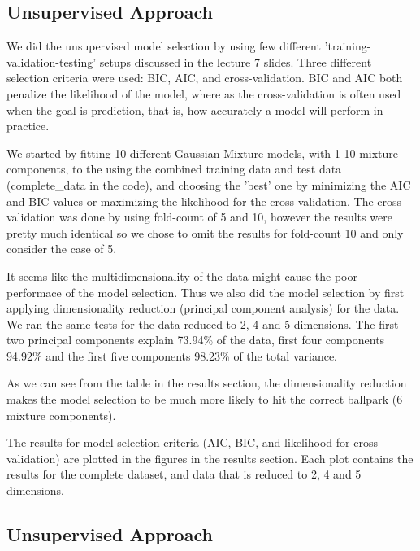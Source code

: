 \subsection{Unsupervised Approach}
We did the unsupervised model selection by using few different 'training-validation-testing' setups discussed in the lecture 7 slides. Three different selection criteria were used: BIC, AIC, and cross-validation. BIC and AIC both penalize the likelihood of the model, where as the cross-validation is often used when the goal is prediction, that is, how accurately a model will perform in practice.

We started by fitting 10 different Gaussian Mixture models, with 1-10 mixture components, to the using the combined training data and test data (complete\_data in the code), and choosing the 'best' one by minimizing the AIC and BIC values or maximizing the likelihood for the cross-validation. The cross-validation was done by using fold-count of 5 and 10, however the results were pretty much identical so we chose to omit the results for fold-count 10 and only consider the case of 5.

It seems like the multidimensionality of the data might cause the poor performace of the model selection. Thus we also did the model selection by first applying dimensionality reduction (principal component analysis) for the data. We ran the same tests for the data reduced to 2, 4 and 5 dimensions. The first two principal components explain 73.94\% of the data, first four components 94.92\% and the first five components 98.23\% of the total variance.

As we can see from the table in the results section, the dimensionality reduction makes the model selection to be much more likely to hit the correct ballpark (6 mixture components).

The results for model selection criteria (AIC, BIC, and likelihood for cross-validation) are plotted in the figures in the results section. Each plot contains the results for the complete dataset, and data that is reduced to 2, 4 and 5 dimensions.

\subsection{Unsupervised Approach}

